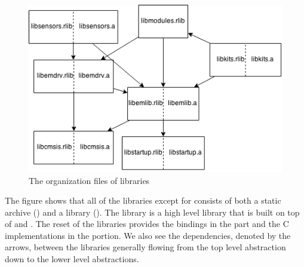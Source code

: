 \begin{figure}[H]
  \begin{center}
    \includegraphics[scale=0.5]{figures/lib-structure.png}
  \end{center}
  \caption{The organization files of libraries}
  \label{fig:lib:structure}
\end{figure}

The figure shows that all of the libraries except for  consists of both a {\C} static archive () and a {\rust} library ().
The  library is a high level library that is built on top of {\emlib} and .
The reset of the libraries provides the {\rust} bindings in the  part and the C implementations in the  portion.
We also see the dependencies, denoted by the arrows, between the libraries generally flowing from the top level abstraction down to the lower level abstractions.
